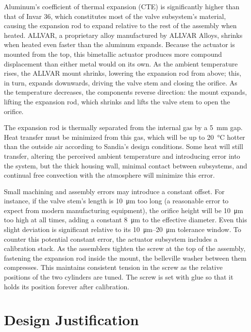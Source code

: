 \documentclass[12pt, letterpaper]{report}%
\newcounter{mycounter}           %
\newcounter{sub}[mycounter]      %
\begin{document}
			Aluminum's coefficient of thermal expansion (CTE) is significantly higher than that of Invar 36, which constitutes most of the valve subsystem's material,
			causing the expansion rod to expand relative to the rest of the assembly when heated.
			ALLVAR, a proprietary alloy manufactured by ALLVAR Alloys, shrinks when heated even faster than the aluminum expands.
			Because the actuator is mounted from the top, this bimetallic actuator produces more compound displacement than either metal would on its own.
			As the ambient temperature rises, the ALLVAR mount shrinks, lowering the expansion rod from above;
			this, in turn, expands downwards, driving the valve stem and closing the orifice.
			As the temperature decreases, the components reverse direction:
			the mount expands, lifting the expansion rod, which shrinks and lifts the valve stem to open the orifice.

			The expansion rod is thermally separated from the internal gas by a \SI{5}{\milli\meter} gap. Heat transfer must be minimized from this gas, which will be up to \SI{20}{\degreeCelsius} hotter than the outside air
			according to Sandia's design conditions.
			Some heat will still transfer, altering the perceived ambient temperature and introducing error into the system,
			but the thick housing wall, minimal contact between subsystems, and continual free convection with the atmosphere will minimize this error.

			Small machining and assembly errors may introduce a constant offset. For instance, if the valve stem's length is \SI{10}{\micro\meter} too long
			(a reasonable error to expect from modern manufacturing equipment),
			the orifice height will be \SI{10}{\micro\meter} too high at all times, adding a constant \SI{8}{\micro\meter} to the effective diameter.
			Even this slight deviation is significant relative to its \SIrange{10}{20}{\micro\meter} tolerance window.
			To counter this potential constant error, the actuator subsystem includes a calibration stack.
			As the assemblers tighten the screw at the top of the assembly, fastening the expansion rod inside the mount,
			the belleville washer between them compresses. This maintains consistent tension in the screw as the relative positions of the two cylinders are tuned.
			The screw is set with glue so that it holds its position forever after calibration.

	\section{Design Justification}
	\label{sec:design:just}
\end{document}
